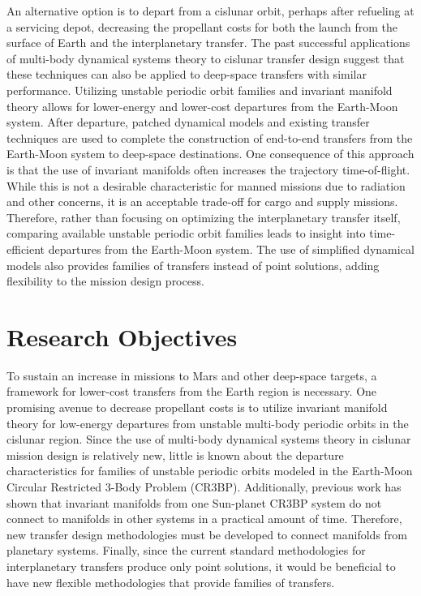 An alternative option is to depart from a cislunar orbit, perhaps after refueling at a
servicing depot, decreasing the propellant costs for both the launch from the surface of Earth and the
interplanetary transfer. The past successful applications of multi-body dynamical systems theory to
cislunar transfer design suggest that these techniques can also be applied to deep-space transfers with
similar performance. Utilizing unstable periodic orbit families and invariant manifold theory
allows for lower-energy and lower-cost departures from the Earth-Moon system. After departure, patched
dynamical models and existing transfer techniques are used to complete the construction of
end-to-end transfers from the Earth-Moon system to deep-space destinations. One consequence of this approach is that the use
of invariant manifolds often increases the trajectory time-of-flight. While this is not a desirable
characteristic for manned missions due to radiation and other concerns, it is an acceptable
trade-off for cargo and supply missions. Therefore, rather than focusing on optimizing the
interplanetary transfer itself, comparing available unstable periodic orbit families
leads to insight into time-efficient departures from the Earth-Moon system. The use of simplified
dynamical models also provides families of transfers instead of point solutions, adding flexibility
to the mission design process.

\section{Research Objectives}
To sustain an increase in missions to Mars and other deep-space targets, a framework for lower-cost
transfers from the Earth region is necessary. One promising avenue to decrease propellant costs is
to utilize invariant manifold theory for low-energy departures from unstable multi-body
periodic orbits in the cislunar region. Since the use of multi-body dynamical systems theory in cislunar mission design is
relatively new, little is known about the departure characteristics for families of
unstable periodic orbits modeled in the Earth-Moon Circular Restricted 3-Body Problem (CR3BP). Additionally, previous work has shown that invariant manifolds from one Sun-planet CR3BP system
do not connect to manifolds in other systems in a practical amount of time\cite{Koon:2000}.
Therefore, new transfer design methodologies must be developed to connect manifolds from planetary systems. Finally,
since the current standard methodologies for interplanetary transfers produce only point solutions,
it would be beneficial to have new flexible methodologies that provide families of transfers.

